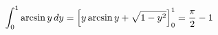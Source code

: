 \documentclass[preview]{standalone}
\begin{document}
\begin{align*}
\special{dvisvgm:raw <g id='unique000'>}\displaystyle\int_0^1\arcsin y\,dy=\left[y\arcsin y+\sqrt{1-y^2}\right]_0^1=\dfrac{\pi}{2}-1\special{dvisvgm:raw </g>}
\end{align*}
\end{document}
